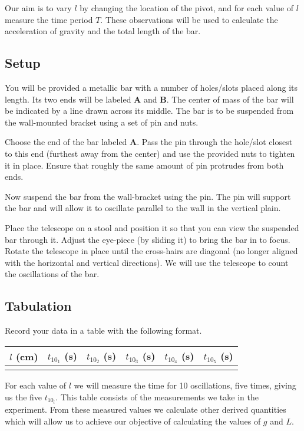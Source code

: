 \documentclass{article}
\begin{document}
      Our aim is to vary $l$ by changing the location of the pivot, and for each value of $l$ measure the time period $T$. These observations will be used to calculate the acceleration of gravity and the total length of the bar.

      \subsection*{Setup}

         You will be provided a metallic bar with a number of holes/slots placed along its length. Its two ends will be labeled \textbf{A} and \textbf{B}. The center of mass of the bar will be indicated by a line drawn across its middle. The bar is to be suspended from the wall-mounted bracket using a set of pin and nuts.

         Choose the end of the bar labeled \textbf{A}. Pass the pin through the hole/slot closest to this end (furthest away from the center) and use the provided nuts to tighten it in place. Ensure that roughly the same amount of pin protrudes from both ends.

         Now suspend the bar from the wall-bracket using the pin. The pin will support the bar and will allow it to oscillate parallel to the wall in the vertical plain.

         Place the telescope on a stool and position it so that you can view the suspended bar through it. Adjust the eye-piece (by sliding it) to bring the bar in to focus. Rotate the telescope in place until the cross-hairs are diagonal (no longer aligned with the horizontal and vertical directions). We will use the telescope to count the oscillations of the bar.

      \subsection*{Tabulation}

         Record your data in a table with the following format.

         \begin{table}[h]
            \centering

            \begin{tabular}{| c | c | c | c | c | c |}

               \hline
               $l$ (\si{\centi\metre}) & $t_{10_1}$ (\si{\second}) & $t_{10_2}$ (\si{\second}) & $t_{10_3}$ (\si{\second}) & $t_{10_4}$ (\si{\second}) & $t_{10_5}$ (\si{\second}) \\

               \hline
                  & & & & & \\
               \hline

            \end{tabular}
         \end{table}
         For each value of $l$ we will measure the time for 10 oscillations, five times, giving us the five $t_{10_i}$. This table consists of the measurements we take in the experiment. From these measured values we calculate other derived quantities which will allow us to achieve our objective of calculating the values of $g$ and $L$. 
\end{document}
